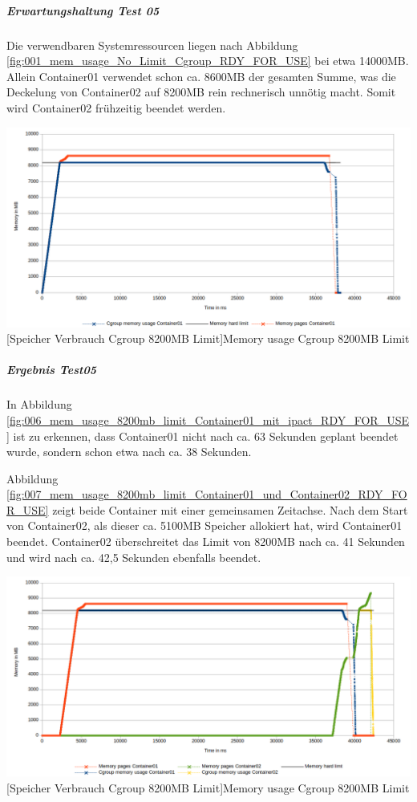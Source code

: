 \subparagraph{Erwartungshaltung Test 05}
Die verwendbaren Systemressourcen liegen nach Abbildung \ref{fig:001_mem_usage_No_Limit_Cgroup_RDY_FOR_USE} bei etwa 14000MB. Allein Container01 verwendet schon ca. 8600MB der gesamten Summe, was die Deckelung von Container02 auf 8200MB rein rechnerisch unnötig macht. Somit wird Container02 frühzeitig beendet werden. 

\vspace{1em}
\begin{minipage}{\linewidth}
	\centering
	\includegraphics[width=1\linewidth]{pics/006_mem_usage_8200mb_limit_Container01_mit_ipact_RDY_FOR_USE.png}
	[Speicher Verbrauch Cgroup 8200MB Limit]{Memory usage Cgroup 8200MB Limit}
	\label{fig:006_mem_usage_8200mb_limit_Container01_mit_ipact_RDY_FOR_USE}
\end{minipage}

\subparagraph{Ergebnis Test05}
In Abbildung \ref{fig:006_mem_usage_8200mb_limit_Container01_mit_ipact_RDY_FOR_USE} ist zu erkennen, dass Container01 nicht nach ca. 63 Sekunden geplant beendet wurde, sondern schon etwa nach ca. 38 Sekunden.

Abbildung \ref{fig:007_mem_usage_8200mb_limit_Container01_und_Container02_RDY_FOR_USE} zeigt beide Container mit einer gemeinsamen Zeitachse. Nach dem Start von Container02, als dieser ca. 5100MB Speicher allokiert hat, wird Container01 beendet. Container02 überschreitet das Limit von 8200MB nach ca. 41 Sekunden und wird nach ca. 42,5 Sekunden ebenfalls beendet.

\vspace{1em}
\begin{minipage}{\linewidth}
	\centering
	\includegraphics[width=1\linewidth]{pics/007_mem_usage_8200mb_limit_Container01_und_Container02_RDY_FOR_USE.png}
	[Speicher Verbrauch Cgroup 8200MB Limit]{Memory usage Cgroup 8200MB Limit}
	\label{fig:007_mem_usage_8200mb_limit_Container01_und_Container02_RDY_FOR_USE}
\end{minipage}

